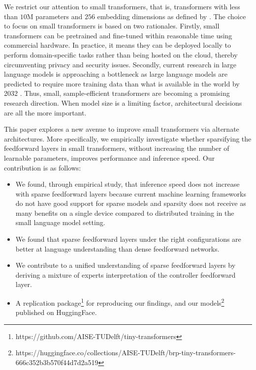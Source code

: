 We restrict our attention to small transformers, that is, transformers with less than $10\text{M}$ parameters and $256$ embedding dimensions as defined by \citet{eldan_tinystories_2023}. The choice to focus on small transformers is based on two rationales. Firstly, small transformers can be pretrained and fine-tuned within reasonable time using commercial hardware. In practice, it means they can be deployed locally to perform domain-specific tasks rather than being hosted on the cloud, thereby circumventing privacy and security issues. Secondly, current research in large language models is approaching a bottleneck as large language models are predicted to require more training data than what is available in the world by 2032 \cite{villalobos_will_2024}. Thus, small, sample-efficient transformers are becoming a promising research direction. When model size is a limiting factor, architectural decisions are all the more important.

This paper explores a new avenue to improve small transformers via alternate architectures. More specifically, we empirically investigate whether sparsifying the feedforward layers in small transformers, without increasing the number of learnable parameters, improves performance and inference speed. Our contribution is as follows:
\begin{itemize}
    \item We found, through empirical study, that inference speed does not increase with sparse feedforward layers because current machine learning frameworks do not have good support for sparse models and sparsity does not receive as many benefits on a single device compared to distributed training in the small language model setting.
    \item We found that sparse feedforward layers under the right configurations are better at language understanding than dense feedforward networks.
    \item We contribute to a unified understanding of sparse feedforward layers by deriving a mixture of experts interpretation of the controller feedforward layer.
    \item A replication package\footnote{https://github.com/AISE-TUDelft/tiny-transformers} for reproducing our findings, and our models\footnote{https://huggingface.co/collections/AISE-TUDelft/brp-tiny-transformers-666c352b3b570f44d7d2a519} published on HuggingFace.
\end{itemize}



